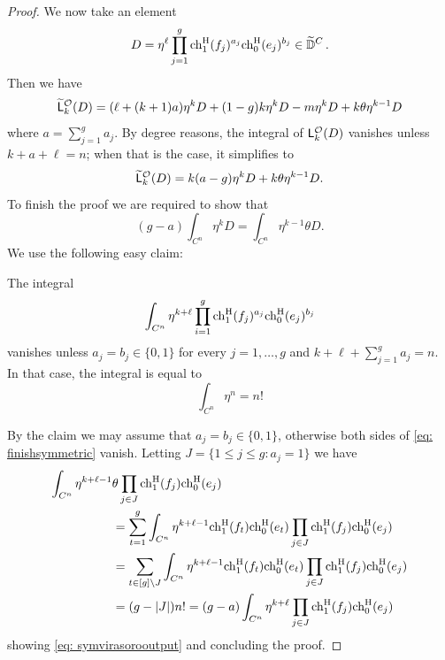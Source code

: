\documentclass[a4paper, 12pt]{amsart}
\begin{document}
\begin{proof}
    We now take an element
    \[D=\eta^\ell \prod_{j=1}^g\mathrm{ch}_1^{\mathrm{H}}(f_j)^{a_j} \mathrm{ch}_0^{\mathrm{H}}(e_j)^{b_j}\in \widetilde {{\mathbb{D}}}^C\,.\]
Then we have
\begin{equation}
\label{eq: symvirasorooutput}
    \widetilde {{\mathsf{L}}}_k^{\mathcal O}(D)=(\ell+(k+1)a)\eta^k \nonumber D+(1-g)k \eta^k D-m \eta^k D+k \theta \eta^{k-1}D
\end{equation}
where $a=\sum_{j=1}^g a_j$. By degree reasons, the integral of ${\mathsf{L}}_k^{\mathcal O}(D)$ vanishes unless $k+a+\ell=n$; when that is the case, it simplifies to
\[\widetilde {{\mathsf{L}}}_k^{\mathcal O}(D)=
k(a-g)\eta^k D+k \theta\eta^{k-1}D.\]
To finish the proof we are required to show that 
\begin{equation}
(g-a)\int_{C^n} \eta^k D=\int_{C^n} \eta^{k-1}\theta D.    \label{eq: finishsymmetric}
\end{equation}
We use the following easy claim:
\begin{claim}
The integral 
\[\int_{C^n} \eta^{k+\ell} \prod_{i=1}^g\mathrm{ch}_1^{\mathrm{H}}(f_j)^{a_j} \mathrm{ch}_0^{\mathrm{H}}(e_j)^{b_j}\]
vanishes unless $a_j=b_j\in \{0,1\}$ for every $j=1, \ldots, g$ and $k+\ell+\sum_{j=1}^g a_j=n$. In that case, the integral is equal to 
\[\int_{C^n}\eta^n=n!\]
\end{claim}
By the claim we may assume that $a_j=b_j\in \{0,1\}$, otherwise both sides of \eqref{eq: finishsymmetric} vanish. Letting $J=\{1\leq j\leq g\colon a_j=1\}$ we have
\begin{align*}
\int_{C^n}\eta^{k+\ell-1}&\theta \prod_{j\in J}\mathrm{ch}_1^{\mathrm{H}}(f_j)\mathrm{ch}_0^{\mathrm{H}}(e_j)\\
&=\sum_{t=1}^g \int_{C^n}\eta^{k+\ell-1}\mathrm{ch}_1^{\mathrm{H}}(f_t)\mathrm{ch}_0^{\mathrm{H}}(e_t)\prod_{j\in J}\mathrm{ch}_1^{\mathrm{H}}(f_j)\mathrm{ch}_0^{\mathrm{H}}(e_j)\\
&=\sum_{t\in [g]\setminus J} \int_{C^n}\eta^{k+\ell-1}\mathrm{ch}_1^{\mathrm{H}}(f_t)\mathrm{ch}_0^{\mathrm{H}}(e_t)\prod_{j\in J}\mathrm{ch}_1^{\mathrm{H}}(f_j)\mathrm{ch}_0^{\mathrm{H}}(e_j)\\
&=(g-|J|)n!=(g-a)\int_{C^n} \eta^{k+\ell} \prod_{j\in J}\mathrm{ch}_1^{\mathrm{H}}(f_j)\mathrm{ch}_0^{\mathrm{H}}(e_j)
\end{align*}
showing \eqref{eq: symvirasorooutput} and concluding the proof.\qedhere
\end{proof}

\end{document}
